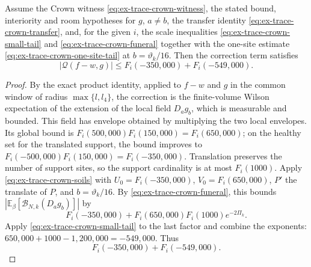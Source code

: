 \begin{lemma}
\label{lem:ex-trace-crown-exception}
Assume the Crown witness \eqref{eq:ex-trace-crown-witness}, the stated
bound, interiority and room hypotheses for $g$, $a\ne b$, the transfer
identity \eqref{eq:ex-trace-crown-transfer}, and, for the given $i$, the
scale inequalities \eqref{eq:ex-trace-crown-small-tail} and
\eqref{eq:ex-trace-crown-funeral} together with the one-site estimate
\eqref{eq:ex-trace-crown-one-site-tail} at $b=\vartheta_k/16$. Then the
correction term satisfies
\[ |\mathcal Q(f-w,g)|\le F_i(-350{,}000)+F_i(-549{,}000).\]
\end{lemma}
\begin{proof}
By the exact product identity, applied to $f-w$ and $g$ in the common
window of radius $\max\{l,l_4\}$, the correction is the finite-volume Wilson
expectation of the extension of the local field $D_a g_b$, which is
measurable and bounded. This field has envelope obtained by
multiplying the two local envelopes. Its global bound is
$F_i(500{,}000)F_i(150{,}000)=F_i(650{,}000)$; on the healthy set for the
translated support, the bound improves to
$F_i(-500{,}000)F_i(150{,}000)=F_i(-350{,}000)$. Translation preserves the
number of support sites, so the support cardinality is at most $F_i(1000)$.
Apply \eqref{eq:ex-trace-crown-soils} with
$U_0=F_i(-350{,}000)$, $V_0=F_i(650{,}000)$, $P'$ the translate of $P$, and
$b=\vartheta_k/16$. By \eqref{eq:ex-trace-crown-funeral}, this bounds
$|\mathbb E_\beta[\mathcal B_{N,k}(D_a g_b)]|$ by
\[
 F_i(-350{,}000)+F_i(650{,}000)F_i(1000)e^{-2\Pi_k}.
\]
Apply \eqref{eq:ex-trace-crown-small-tail} to the last factor and combine the
exponents: $650{,}000+1000-1{,}200{,}000=-549{,}000$. Thus
\begin{equation}
 F_i(-350{,}000)+F_i(-549{,}000).
 \label{eq:ex-trace-crown-exception-correct}
\end{equation}
\end{proof}

